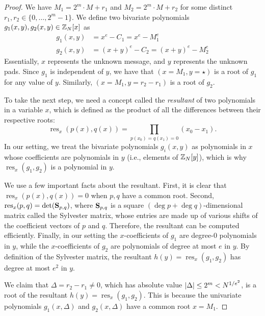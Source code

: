\documentclass[11pt]{article}
\DeclareMathOperator{\res}{res}
\begin{document}
\begin{proof}
  We have $M_1 = 2^{m}\cdot M+r_1$ and $M_2=2^{m}\cdot M+r_2$ for some
  distinct $r_1,r_2 \in \{0,\ldots, 2^{m}-1\}$.  We define two
  bivariate polynomials $g_{1}(x,y), g_{2}(x,y) \in \mathbb{Z}_{N}[x]$ as
  \begin{align}
    g_1(x,y) &= x^{e} - C_1 = x^{e}-M_1^{e} \\
    g_2(x,y) &= (x+y)^{e}-C_2=(x+y)^{e}-M_2^{e}
  \end{align}
  Essentially, $x$ represents the unknown message, and $y$ represents
  the unknown pads. Since $g_1$ is independent of $y$, we have that
  $(x=M_1, y = \star)$ is a root of $g_1$ for any value of $y$.
  Similarly, $(x=M_{1}, y=r_2-r_1)$ is a root of $g_2$.

  To take the next step, we need a concept called the \emph{resultant}
  of two polynomials in a variable $x$, which is defined as the
  product of all the differences between their respective roots:
  \[ \res_x(p(x),q(x))=\prod_{p(x_0)=q(x_1)=0}(x_0-x_1). \]
  In our setting, we treat the bivariate polynomials $g_{i}(x,y)$ as
  polynomials in $x$ whose coefficients are polynomials in $y$ (i.e.,
  elements of $\mathbb{Z}_{N}[y]$), which is why $\res_{x}(g_{1}, g_{2})$ is a
  polynomial in $y$.

  We use a few important facts about the resultant. First, it is clear
  that $\res_x(p(x),q(x))=0$ when $p,q$ have a common root. Second,
  $\res_x(p,q)=\det(\matS_{p,q})$, where $\mathbf{S}_{p,q}$ is a square
  $(\deg{p}+\deg{q})$-dimensional matrix called the Sylvester matrix,
  whose entries are made up of various shifts of the coefficient
  vectors of $p$ and $q$.  Therefore, the resultant can be computed
  efficiently.  Finally, in our setting the $x$-coefficients of
  $g_{1}$ are degree-$0$ polynomials in $y$, while the
  $x$-coefficients of $g_{2}$ are polynomials of degree at most $e$ in
  $y$.  By definition of the Sylvester matrix, the resultant $h(y) =
  \res_{x}(g_{1}, g_{2})$ has degree at most $e^{2}$ in $y$.

  We claim that $\Delta=r_2-r_1 \neq 0$, which has absolute value
  $\lvert\Delta\rvert \leq 2^{m} < N^{1/e^{2}}$, is a root of the resultant
  $h(y)=\res_x(g_1,g_2)$. This is because the univariate polynomials
  $g_1(x,\Delta)$ and $g_2(x,\Delta)$ have a common root $x=M_{1}$.


\end{proof}
\end{document}
